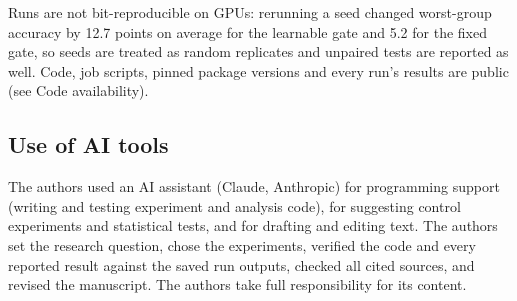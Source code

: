 Runs are not bit-reproducible on GPUs: rerunning a seed changed worst-group accuracy by 12.7 points on average for the
learnable gate and 5.2 for the fixed gate, so seeds are treated as random replicates and unpaired tests are reported
as well. Code, job scripts, pinned package versions and every run's results are public (see Code availability).

\subsection{Use of AI tools}

The authors used an AI assistant (Claude, Anthropic) for programming support (writing and testing experiment and
analysis code), for suggesting control experiments and statistical tests, and for drafting and editing text. The
authors set the research question, chose the experiments, verified the code and every reported result against the
saved run outputs, checked all cited sources, and revised the manuscript. The authors take full responsibility for its
content.
